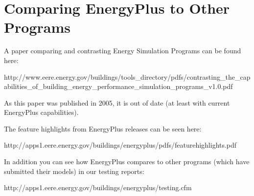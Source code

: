 \section{Comparing EnergyPlus to Other Programs}\label{comparing-energyplus-to-other-programs}

A paper comparing and contrasting Energy Simulation Programs can be found here:

http://www.eere.energy.gov/buildings/tools\_directory/pdfs/contrasting\_the\_capabilities\_of\_building\_energy\_performance\_simulation\_programs\_v1.0.pdf

As this paper was published in 2005, it is out of date (at least with current EnergyPlus capabilities).

The feature highlights from EnergyPlus releases can be seen here:

http://apps1.eere.energy.gov/buildings/energyplus/pdfs/featurehighlights.pdf

In addition you can see how EnergyPlus compares to other programs (which have submitted their models) in our testing reports:

http://apps1.eere.energy.gov/buildings/energyplus/testing.cfm
